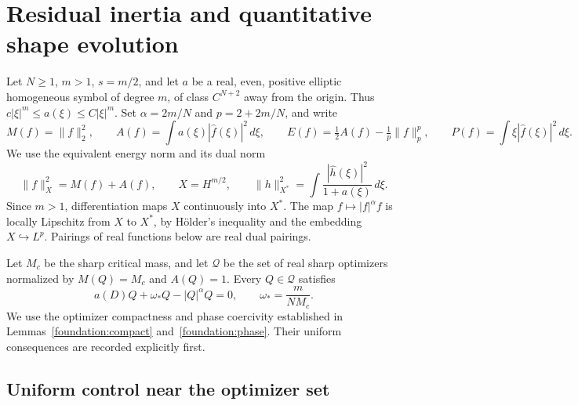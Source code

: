 \section{Residual inertia and quantitative shape evolution}
\label{sec:r9-relative}

Let $N\ge1$, $m>1$, $s=m/2$, and let $a$ be a real, even,
positive elliptic homogeneous symbol of degree $m$, of class
$C^{N+2}$ away from the origin. Thus
$c|\xi|^m\le a(\xi)\le C|\xi|^m$.
Set $\alpha=2m/N$ and $p=2+2m/N$, and write
\[
 M(f)=\|f\|_2^2,\qquad
 A(f)=\int a(\xi)|\widehat f(\xi)|^2\,d\xi,\qquad
 E(f)=\tfrac12A(f)-\tfrac1p\|f\|_p^p,
 \qquad P(f)=\int\xi|\widehat f(\xi)|^2\,d\xi.
\]
We use the equivalent energy norm and its dual norm
\[
 \|f\|_X^2=M(f)+A(f),\qquad X=H^{m/2},\qquad
 \|h\|_{X^*}^2=\int\frac{|\widehat h(\xi)|^2}{1+a(\xi)}\,d\xi.
\]
Since $m>1$, differentiation maps $X$ continuously into $X^*$.
The map $f\mapsto |f|^\alpha f$ is locally Lipschitz from $X$ to
$X^*$, by H\"older's inequality and the embedding $X\hookrightarrow L^p$.
Pairings of real functions below are real dual pairings.

Let $M_c$ be the sharp critical mass, and let $\mathcal Q$ be the
set of real sharp optimizers normalized by $M(Q)=M_c$ and $A(Q)=1$.
Every $Q\in\mathcal Q$ satisfies
\[
 a(D)Q+\omega_*Q-|Q|^\alpha Q=0,
 \qquad \omega_*=\frac{m}{NM_c}.
\]
We use the optimizer compactness and phase coercivity established in
Lemmas~\ref{foundation:compact} and~\ref{foundation:phase}.
Their uniform consequences are recorded explicitly first.

\subsection{Uniform control near the optimizer set}

